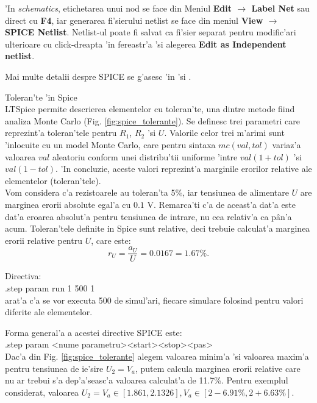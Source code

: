 'In {\em schematics}, etichetarea unui nod se face din Meniul \textbf{Edit $\rightarrow$ Label Net} sau direct cu \textbf{F4}, iar generarea fi'sierului netlist se face din meniul \textbf{View $\rightarrow$ SPICE Netlist}. Netlist-ul poate fi salvat ca fi'sier separat pentru modific'ari ulterioare cu click-dreapta 'in fereastr'a 'si alegerea \textbf{Edit as Independent netlist}.

Mai multe detalii despre SPICE se g'asesc 'in \cite{ltspice} 'si \cite{ltspicewiki}.

\begin{definition}[facultativ] Toleran'te 'in Spice\\
LTSpice permite descrierea elementelor cu toleran'te, una dintre metode fiind analiza Monte Carlo (Fig. \ref{fig:spice_tolerante}). Se definesc trei parametri care reprezint'a toleran'tele pentru $R_1$, $R_2$ 'si $U$. Valorile celor trei m'arimi sunt 'inlocuite cu un model Monte Carlo, care pentru sintaxa $mc(val,tol)$ variaz'a valoarea $val$ aleatoriu conform unei distribu'tii uniforme 'intre $val(1+tol)$ 'si $val(1-tol)$. 'In concluzie, aceste valori reprezint'a marginile erorilor relative ale elementelor (toleran'tele).\\

Vom considera c'a rezistoarele au toleran'ta 5\%, iar tensiunea de alimentare $U$ are marginea erorii absolute egal'a cu $0.1$ V. Remarca'ti c'a de aceast'a dat'a este dat'a eroarea absolut'a pentru tensiunea de intrare, nu cea relativ'a ca p\^an'a acum. Toleran'tele definite in Spice sunt relative, deci trebuie calculat'a marginea erorii relative pentru $U$, care este:
\begin{equation*} 
r_U = \frac{a_U}{U} = 0.0167 = 1.67\%.
\end{equation*}

Directiva:\\
.step param run 1 500 1 \\
arat'a c'a se vor executa 500 de simul'ari, fiecare simulare folosind pentru valori diferite ale elementelor. 

Forma general'a a acestei directive SPICE este: \\
.step param \textless nume parametru\textgreater \textless start\textgreater \textless stop\textgreater \textless pas\textgreater\\

Dac'a din Fig. \ref{fig:spice_tolerante} alegem valoarea minim'a 'si valoarea maxim'a pentru tensiunea de ie'sire $U_2 = V_a$, putem calcula marginea erorii relative care nu ar trebui s'a dep'a'seasc'a valoarea calculat'a de 11.7\%.
Pentru exemplul considerat, valoarea $U_2 = V_a \in [1.861, 2.1326], V_a \in \left[2-6.91\%, 2+6.63\%\right]$.\\


\end{definition}
